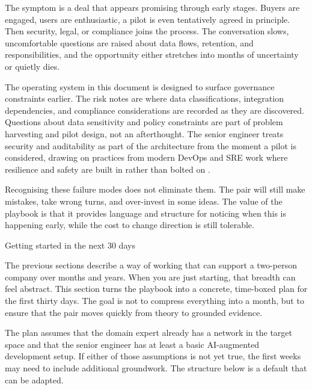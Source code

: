 \documentclass[10pt, a4paper, twocolumn]{article} %
\makeatletter
\let\orig@section\section %
\renewcommand{\section}{%
  \@ifstar{\orig@section*}{\unnumberedsteppingsection}%
}
\newcommand{\unnumberedsteppingsection}[1]{%
  \refstepcounter{section}%
  \orig@section*{#1}%
}
\makeatother
\begin{document}
The symptom is a deal that appears promising through early stages. Buyers are engaged, users are enthusiastic, a pilot is even tentatively agreed in principle. Then security, legal, or compliance joins the process. The conversation slows, uncomfortable questions are raised about data flows, retention, and responsibilities, and the opportunity either stretches into months of uncertainty or quietly dies.

The operating system in this document is designed to surface governance constraints earlier. The risk notes are where data classifications, integration dependencies, and compliance considerations are recorded as they are discovered. Questions about data sensitivity and policy constraints are part of problem harvesting and pilot design, not an afterthought. The senior engineer treats security and auditability as part of the architecture from the moment a pilot is considered, drawing on practices from modern DevOps and SRE work where resilience and safety are built in rather than bolted on \citep{forsgren2018accelerate}.

Recognising these failure modes does not eliminate them. The pair will still make mistakes, take wrong turns, and over-invest in some ideas. The value of the playbook is that it provides language and structure for noticing when this is happening early, while the cost to change direction is still tolerable.





\clearpage

\section{Getting started in the next 30 days}

The previous sections describe a way of working that can support a two-person company over months and years. When you are just starting, that breadth can feel abstract. This section turns the playbook into a concrete, time-boxed plan for the first thirty days. The goal is not to compress everything into a month, but to ensure that the pair moves quickly from theory to grounded evidence.

The plan assumes that the domain expert already has a network in the target space and that the senior engineer has at least a basic AI-augmented development setup. If either of those assumptions is not yet true, the first weeks may need to include additional groundwork. The structure below is a default that can be adapted.
\end{document}
